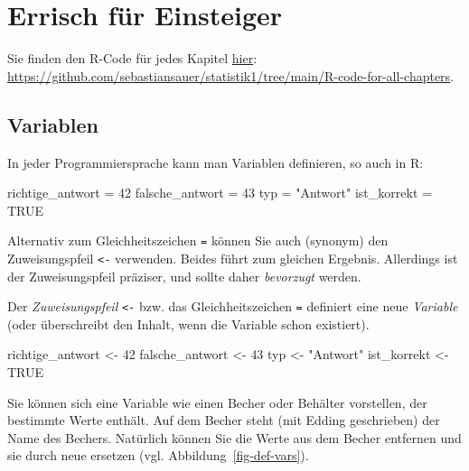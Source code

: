 \documentclass[
  letterpaper,
]{scrbook}
\newenvironment{Shaded}{\begin{snugshade}}{\end{snugshade}}
\newcommand{\ConstantTok}[1]{\textcolor[rgb]{0.56,0.35,0.01}{#1}}
\newcommand{\DecValTok}[1]{\textcolor[rgb]{0.68,0.00,0.00}{#1}}
\newcommand{\NormalTok}[1]{\textcolor[rgb]{0.00,0.23,0.31}{#1}}
\newcommand{\OtherTok}[1]{\textcolor[rgb]{0.00,0.23,0.31}{#1}}
\newcommand{\StringTok}[1]{\textcolor[rgb]{0.13,0.47,0.30}{#1}}
\theoremstyle{definition}
\theoremstyle{definition}
\theoremstyle{definition}
\theoremstyle{remark}
\begin{document}
\section{Errisch für Einsteiger}\label{errisch-fuxfcr-einsteiger}

Sie finden den R-Code für jedes Kapitel
\href{https://github.com/sebastiansauer/statistik1/tree/main/R-code-for-all-chapters}{hier}:
\url{https://github.com/sebastiansauer/statistik1/tree/main/R-code-for-all-chapters}.

\subsection{Variablen}\label{sec-rvars}

In jeder Programmiersprache kann man Variablen definieren, so auch in R:

\begin{Shaded}
\begin{Highlighting}[]
\NormalTok{richtige\_antwort }\OtherTok{=} \DecValTok{42}
\NormalTok{falsche\_antwort }\OtherTok{=} \DecValTok{43}
\NormalTok{typ }\OtherTok{=} \StringTok{"Antwort"}
\NormalTok{ist\_korrekt }\OtherTok{=} \ConstantTok{TRUE}
\end{Highlighting}
\end{Shaded}

Alternativ zum Gleichheitszeichen \texttt{=} können Sie auch (synonym)
den Zuweisungspfeil \texttt{\textless{}-} verwenden. Beides führt zum
gleichen Ergebnis. Allerdings ist der Zuweisungspfeil präziser, und
sollte daher \emph{bevorzugt} werden.

Der \emph{Zuweisungspfeil} \texttt{\textless{}-} bzw. das
Gleichheitszeichen \texttt{=} definiert eine neue \emph{Variable} (oder
überschreibt den Inhalt, wenn die Variable schon existiert).

\begin{Shaded}
\begin{Highlighting}[]
\NormalTok{richtige\_antwort }\OtherTok{\textless{}{-}} \DecValTok{42}
\NormalTok{falsche\_antwort }\OtherTok{\textless{}{-}} \DecValTok{43}
\NormalTok{typ }\OtherTok{\textless{}{-}} \StringTok{"Antwort"}
\NormalTok{ist\_korrekt }\OtherTok{\textless{}{-}} \ConstantTok{TRUE}
\end{Highlighting}
\end{Shaded}

Sie können sich eine Variable wie einen Becher oder Behälter vorstellen,
der bestimmte Werte enthält. Auf dem Becher steht (mit Edding
geschrieben) der Name des Bechers. Natürlich können Sie die Werte aus
dem Becher entfernen und sie durch neue ersetzen (vgl.
Abbildung~\ref{fig-def-vars}).
\end{document}
